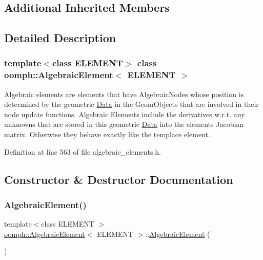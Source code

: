 \subsection*{Additional Inherited Members}


\subsection{Detailed Description}
\subsubsection*{template$<$class E\+L\+E\+M\+E\+NT$>$\newline
class oomph\+::\+Algebraic\+Element$<$ E\+L\+E\+M\+E\+N\+T $>$}

Algebraic elements are elements that have Algebraic\+Nodes whose position is determined by the geometric \hyperlink{classoomph_1_1Data}{Data} in the Geom\+Objects that are involved in their node update functions. Algebraic Elements include the derivatives w.\+r.\+t. any unknowns that are stored in this geometric \hyperlink{classoomph_1_1Data}{Data} into the element\textquotesingle{}s Jacobian matrix. Otherwise they behave exactly like the templace element. 

Definition at line 563 of file algebraic\+\_\+elements.\+h.



\subsection{Constructor \& Destructor Documentation}
\mbox{\label{classoomph_1_1AlgebraicElement_acc029b6daf56771f0f691e9e82d3f674}} 
\subsubsection{\texorpdfstring{Algebraic\+Element()}{AlgebraicElement()}\hspace{0.1cm}{\footnotesize\ttfamily [1/3]}}
{\footnotesize\ttfamily template$<$class E\+L\+E\+M\+E\+NT $>$ \\
\hyperlink{classoomph_1_1AlgebraicElement}{oomph\+::\+Algebraic\+Element}$<$ E\+L\+E\+M\+E\+NT $>$\+::\hyperlink{classoomph_1_1AlgebraicElement}{Algebraic\+Element} (\begin{DoxyParamCaption}{ }\end{DoxyParamCaption})\hspace{0.3cm}{\ttfamily [inline]}}



